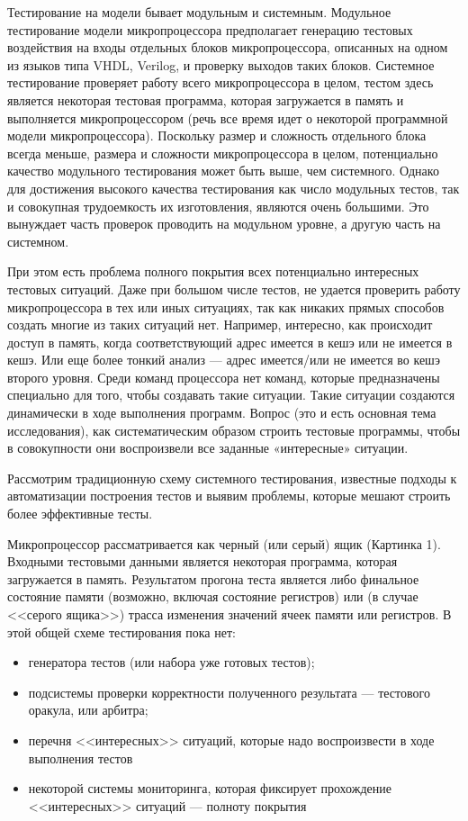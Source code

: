 \documentclass[14pt]{extreport}
\begin{document}
Тестирование на модели бывает модульным и системным. Модульное тестирование модели микропроцессора предполагает генерацию тестовых воздействия на входы отдельных блоков микропроцессора, описанных на одном из языков типа VHDL, Verilog, и проверку выходов таких блоков. Системное тестирование проверяет работу всего микропроцессора в целом, тестом здесь является некоторая тестовая программа, которая загружается в память и выполняется микропроцессором (речь все время идет о некоторой программной модели микропроцессора). Поскольку размер и сложность отдельного блока всегда меньше, размера и сложности микропроцессора в целом, потенциально качество модульного тестирования может быть выше, чем системного. Однако для достижения высокого качества тестирования как число модульных тестов, так и совокупная трудоемкость их изготовления, являются очень большими. Это вынуждает часть проверок проводить на модульном уровне, а другую часть на системном. 

При этом есть проблема полного покрытия всех потенциально интересных тестовых ситуаций. Даже при большом числе тестов, не удается проверить работу микропроцессора в тех или иных ситуациях, так как никаких прямых способов создать многие из таких ситуаций нет. Например, интересно, как происходит доступ в память, когда соответствующий адрес имеется в кешэ или не имеется в кешэ. Или еще более тонкий анализ --- адрес имеется/или не имеется во кешэ второго уровня. Среди команд процессора нет команд, которые предназначены специально для того, чтобы создавать такие ситуации. Такие ситуации создаются динамически в ходе выполнения программ. Вопрос (это и есть основная тема исследования), как систематическим образом строить тестовые программы, чтобы в совокупности они воспроизвели все заданные «интересные» ситуации.

Рассмотрим традиционную схему системного тестирования, известные подходы к автоматизации построения тестов и выявим проблемы, которые мешают строить более эффективные тесты.

Микропроцессор рассматривается как черный (или серый) ящик (Картинка 1). Входными тестовыми данными является некоторая программа, которая загружается в память. Результатом прогона теста является либо финальное состояние памяти (возможно, включая состояние регистров) или (в случае <<серого ящика>>) трасса изменения значений ячеек памяти или регистров.
В этой общей схеме тестирования пока нет:
\begin{itemize}
	\item	генератора тестов (или набора уже готовых тестов);
	\item	подсистемы проверки корректности полученного результата --- тестового оракула, или арбитра;
	\item	перечня <<интересных>> ситуаций, которые надо воспроизвести в ходе выполнения тестов
	\item	некоторой системы мониторинга, которая фиксирует прохождение <<интересных>> ситуаций --- полноту покрытия
\end{itemize}
\end{document}
